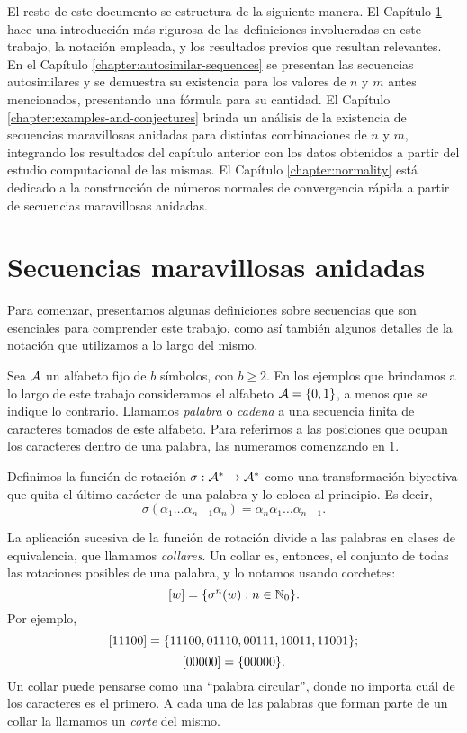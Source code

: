\medskip

El resto de este documento se estructura de la siguiente manera. El Capítulo
\ref{chapter:preliminaries} hace una introducción más rigurosa de las definiciones
involucradas en este trabajo, la notación empleada, y los resultados previos
que resultan relevantes. En el Capítulo \ref{chapter:autosimilar-sequences}
se presentan las secuencias autosimilares y se demuestra su existencia para
los valores de $n$ y $m$ antes mencionados, presentando una fórmula para su
cantidad. El Capítulo \ref{chapter:examples-and-conjectures} brinda un
análisis de la existencia de secuencias maravillosas anidadas para distintas
combinaciones de $n$ y $m$, integrando los resultados del capítulo anterior
con los datos obtenidos a partir del estudio computacional de las mismas.
El Capítulo \ref{chapter:normality} está dedicado a la construcción de números
normales de convergencia rápida a partir de secuencias maravillosas anidadas.

\newpage

\chapter{Secuencias maravillosas anidadas}
\label{chapter:preliminaries}

Para comenzar, presentamos algunas definiciones sobre secuencias que son
esenciales para comprender este trabajo, como así también algunos detalles
de la notación que utilizamos a lo largo del mismo.

Sea $\mathcal{A}$ un alfabeto fijo de $b$ símbolos, con $b \geq 2$. En los
ejemplos que brindamos a lo largo de este trabajo consideramos el alfabeto
$\mathcal{A} = \lbrace 0, 1 \rbrace$, a menos que se indique lo contrario.
Llamamos \emph{palabra} o \emph{cadena} a una secuencia finita de caracteres
tomados de este alfabeto.
Para referirnos a las posiciones que ocupan los caracteres dentro de una
palabra, las numeramos comenzando en $1$.

Definimos la función de rotación $\sigma: \mathcal{A}^* \to \mathcal{A}^*$ como
una transformación biyectiva que quita el último carácter de una palabra y lo
coloca al principio. Es decir,
\[ \sigma(\alpha_1\dots\alpha_{n-1}\alpha_n) =
	\alpha_n\alpha_1\dots\alpha_{n-1}. \]

La aplicación sucesiva de la función de rotación divide a las palabras en clases
de equivalencia, que llamamos \emph{collares}. Un collar es, entonces, el
conjunto de todas las rotaciones posibles de una palabra, y lo notamos usando
corchetes:
\[ \left[w\right] = \lbrace \sigma^{n}(w) : n \in \mathbb{N}_0 \rbrace. \]
Por ejemplo,
\[ \left[11100\right] = \lbrace 11100, 01110, 00111, 10011, 11001 \rbrace; \]
\[ \left[00000\right] = \lbrace 00000 \rbrace. \]
Un collar puede pensarse como una ``palabra circular'', donde no importa
cuál de los caracteres es el primero. A cada una de las palabras que forman
parte de un collar la llamamos un \emph{corte} del mismo.

